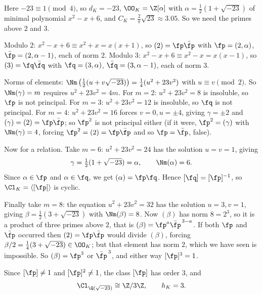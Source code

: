\begin{example}[$K = \Q(\sqrt{-23})$]\label{ex:cl23}
	Here $-23 \equiv 1\pmod 4$, so $d_K = -23$, $\OO_K = \Z[\alpha]$ with $\alpha = \tfrac12(1+\sqrt{-23})$ of minimal polynomial $x^2-x+6$, and $C_K = \tfrac2\pi\sqrt{23}\approx 3.05$. So we need the primes above $2$ and $3$.

	Modulo $2$: $x^2-x+6 \equiv x^2+x = x(x+1)$, so $(2) = \fp\bar\fp$ with $\fp = (2,\alpha)$, $\bar\fp = (2,\alpha-1)$, each of norm $2$. Modulo $3$: $x^2-x+6\equiv x^2-x = x(x-1)$, so $(3) = \fq\bar\fq$ with $\fq = (3,\alpha)$, $\bar\fq = (3,\alpha-1)$, each of norm $3$.

	Norms of elements: $\Nm\left(\tfrac12(u+v\sqrt{-23})\right) = \tfrac14(u^2+23v^2)$ with $u \equiv v \pmod 2$. So $\Nm(\gamma) = m$ requires $u^2+23v^2 = 4m$. For $m = 2$: $u^2+23v^2 = 8$ is insoluble, so $\fp$ is not principal. For $m = 3$: $u^2+23v^2 = 12$ is insoluble, so $\fq$ is not principal. For $m=4$: $u^2+23v^2=16$ forces $v = 0, u = \pm4$, giving $\gamma = \pm 2$ and $(\gamma) = (2) = \fp\bar\fp$; so $\fp^2$ is not principal either (if it were, $\fp^2 = (\gamma)$ with $\Nm(\gamma) = 4$, forcing $\fp^2 = (2) = \fp\bar\fp$ and so $\fp = \bar\fp$, false).

	Now for a relation. Take $m = 6$: $u^2+23v^2 = 24$ has the solution $u = v = 1$, giving
	$$\gamma = \tfrac12(1+\sqrt{-23}) = \alpha, \qquad \Nm(\alpha) = 6.$$
	Since $\alpha \in \fp$ and $\alpha \in \fq$, we get $(\alpha) = \fp\fq$. Hence $[\fq] = [\fp]^{-1}$, so $\Cl_K = \langle[\fp]\rangle$ is cyclic.

	Finally take $m=8$: the equation $u^2+23v^2=32$ has the solution $u = 3, v = 1$, giving $\beta = \tfrac12(3+\sqrt{-23})$ with $\Nm(\beta) = 8$. Now $(\beta)$ has norm $8 = 2^3$, so it is a product of three primes above $2$, that is $(\beta) = \fp^a\bar\fp^{\,3-a}$. If both $\fp$ and $\bar\fp$ occurred then $(2) = \fp\bar\fp$ would divide $(\beta)$, forcing $\beta/2 = \tfrac14(3+\sqrt{-23}) \in \OO_K$; but that element has norm $2$, which we have seen is impossible. So $(\beta) = \fp^3$ or $\bar\fp^{\,3}$, and either way $[\fp]^3 = 1$.

	Since $[\fp] \ne 1$ and $[\fp]^2\neq1$, the class $[\fp]$ has order $3$, and
	$$\Cl_{\Q(\sqrt{-23})}\cong\Z/3\Z, \qquad h_K = 3.$$
\end{example}

